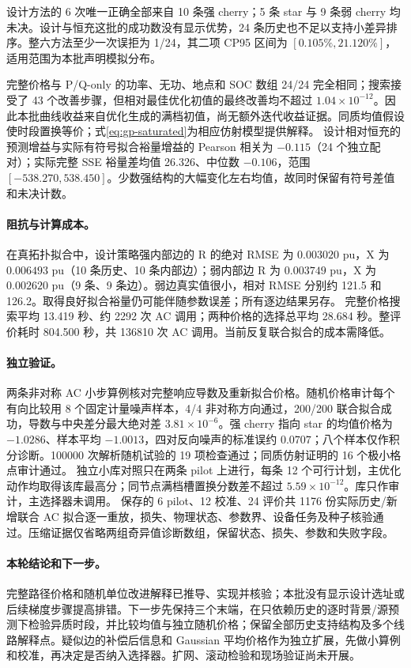 \documentclass[UTF8,fontset=fandol,11pt,a4paper]{ctexart}
\begin{document}
设计方法的 6 次唯一正确全部来自 10 条强 cherry；5 条 star 与 9 条弱 cherry 均未决。设计与恒充这批的成功数没有显示优势，24 条历史也不足以支持小差异排序。整六方法至少一次误拒为 1/24，其二项 CP95 区间为 $[0.105\%,21.120\%]$，适用范围为本批声明模拟分布。

完整价格与 P/Q-only 的功率、无功、地点和 SOC 数组 24/24 完全相同；搜索接受了 43 个改善步骤，但相对最佳优化初值的最终改善均不超过 $1.04\times10^{-12}$。因此本批曲线收益来自优化生成的满档初值，尚无额外迭代收益证据。同质均值假设使时段置换等价；式\eqref{eq:gp-saturated}为相应仿射模型提供解释。
设计相对恒充的预测增益与实际有符号拟合裕量增益的 Pearson 相关为 $-0.115$（24 个独立配对）；实际完整 SSE 裕量差均值 26.326、中位数 $-0.106$，范围 $[-538.270,538.450]$。少数强结构的大幅变化左右均值，故同时保留有符号差值和未决计数。

\paragraph{阻抗与计算成本。}
在真拓扑拟合中，设计策略强内部边的 R 的绝对 RMSE 为 $0.003020$ pu，X 为 $0.006493$ pu（10 条历史、10 条内部边）；弱内部边 R 为 $0.003749$ pu，X 为 $0.002620$ pu（9 条、9 条边）。弱边真实值很小，相对 RMSE 分别约 121.5 和 126.2。取得良好拟合裕量仍可能伴随参数误差；所有逐边结果另存。
完整价格搜索平均 13.419 秒、约 2292 次 AC 调用；两种价格的选择总平均 28.684 秒。整评价耗时 804.500 秒，共 136810 次 AC 调用。当前反复联合拟合的成本需降低。

\paragraph{独立验证。}
两条非对称 AC 小步算例核对完整响应导数及重新拟合价格。随机价格审计每个有向比较用 8 个固定计量噪声样本，4/4 非对称方向通过，200/200 联合拟合成功，导数与中央差分最大绝对差 $3.81\times10^{-6}$。强 cherry 指向 star 的均值价格为 $-1.0286$、样本平均 $-1.0013$，四对反向噪声的标准误约 $0.0707$；八个样本仅作积分诊断。100000 次解析随机试验的 19 项检查通过；同质仿射证明的 16 个极小格点审计通过。
独立小库对照只在两条 pilot 上进行，每条 12 个可行计划，主优化动作均取得该库最高分；同节点满档槽置换分数差不超过 $5.59\times10^{-12}$。库只作审计，主选择器未调用。
保存的 6 pilot、12 校准、24 评价共 1176 份实际历史/新增联合 AC 拟合逐一重放，损失、物理状态、参数界、设备任务及种子核验通过。压缩证据仅省略两组奇异值诊断数组，保留状态、损失、参数和失败字段。

\paragraph{本轮结论和下一步。}
完整路径价格和随机单位改进解释已推导、实现并核验；本批没有显示设计选址或后续梯度步骤提高排错。下一步先保持三个末端，在只依赖历史的逐时背景/源预测下检验异质时段，并比较均值与独立随机价格；保留全部历史支持结构及多个线路解释点。疑似边的补偿后信息和 Gaussian 平均价格作为独立扩展，先做小算例和校准，再决定是否纳入选择器。扩网、滚动检验和现场验证尚未开展。
\end{document}
